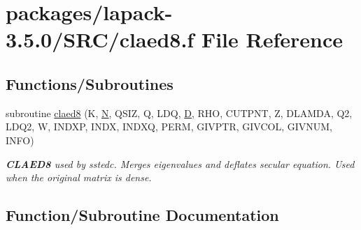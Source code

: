 \hypertarget{claed8_8f}{}\section{packages/lapack-\/3.5.0/\+S\+R\+C/claed8.f File Reference}
\label{claed8_8f}
\subsection*{Functions/\+Subroutines}
\begin{DoxyCompactItemize}
\item 
subroutine \hyperlink{claed8_8f_a8a6257c6272f79f4ce94d312a95c1dc9}{claed8} (K, \hyperlink{polmisc_8c_a0240ac851181b84ac374872dc5434ee4}{N}, Q\+S\+I\+Z, Q, L\+D\+Q, \hyperlink{odrpack_8h_a7dae6ea403d00f3687f24a874e67d139}{D}, R\+H\+O, C\+U\+T\+P\+N\+T, Z, D\+L\+A\+M\+D\+A, Q2, L\+D\+Q2, W, I\+N\+D\+X\+P, I\+N\+D\+X, I\+N\+D\+X\+Q, P\+E\+R\+M, G\+I\+V\+P\+T\+R, G\+I\+V\+C\+O\+L, G\+I\+V\+N\+U\+M, I\+N\+F\+O)
\begin{DoxyCompactList}\small\item\em {\bfseries C\+L\+A\+E\+D8} used by sstedc. Merges eigenvalues and deflates secular equation. Used when the original matrix is dense. \end{DoxyCompactList}\end{DoxyCompactItemize}


\subsection{Function/\+Subroutine Documentation}
\hypertarget{claed8_8f_a8a6257c6272f79f4ce94d312a95c1dc9}{}
